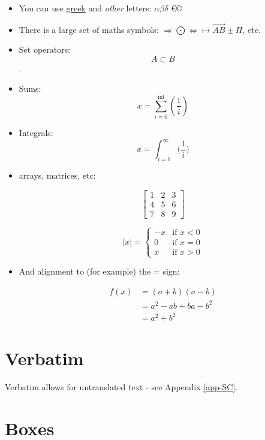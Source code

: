 \documentclass[a4paper,12pt]{report}
\begin{document}
\begin{itemize}

\item You can use \underline{greek} and \textit{other} letters: $\alpha \beta \delta$ \euro \copyright

\item There is a large set of maths symbols: $\Rightarrow \bigodot \iff \mapsto \overrightarrow{AB} \pm \Pi$, etc.

\item Set operators: \[A \subset B\].

\item Sums: \[x = \sum_{i=0}^{\inf}\left(\frac{1}{i}\right)\]

\item Integrals: \[x = \int_{i=0}^{\infty}\big(\frac{1}{i}\big)\]

\item arrays, matrices, etc: 

\[
\begin{bmatrix}
1 & 2 & 3 \\
4 & 5 & 6 \\
7 & 8 & 9
\end{bmatrix}
\]

\begin{equation*}
|x| = \left\{
\begin{array}{rl}
-x & \text{if } x < 0\\
0 & \text{if } x = 0\\
x & \text{if } x > 0
\end{array} \right.
\end{equation*}

\item And alignment to (for example) the = sign:

\begin{align*}
f(x) &= (a+b)(a-b) \\
&= a^2-ab+ba-b^2 \\
&= a^2+b^2 
\end{align*}

\end{itemize}

\section{Verbatim}

Verbatim allows for untranslated text - see Appendix \ref{app-SC}.

\section{Boxes}
\end{document}
